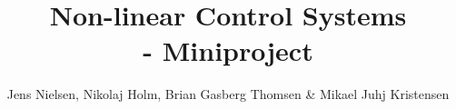 


\title{\vspace{-2cm} Non-linear Control Systems \\ \Large - Miniproject}
\author{Jens Nielsen, Nikolaj Holm, Brian Gasberg Thomsen \& Mikael Juhj Kristensen}
\date{}


\maketitle

\vspace{-1.5cm}
\tableofcontents








